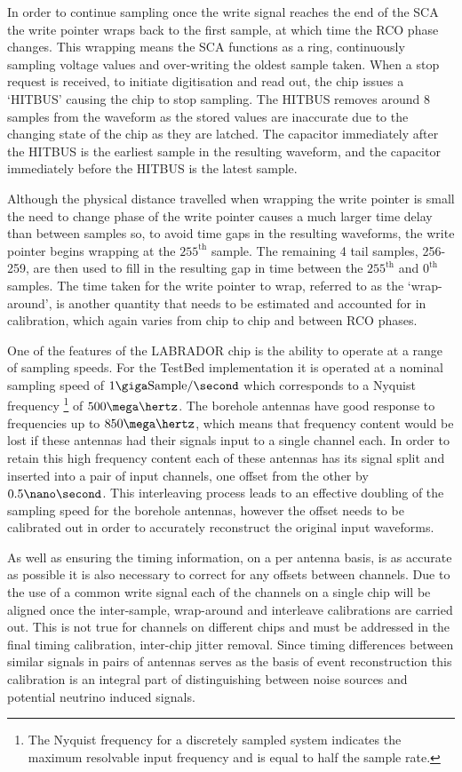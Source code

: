 In order to continue sampling once the write signal reaches the end of the SCA the write pointer wraps back to the first sample, at which time the RCO phase changes. This wrapping means the SCA functions as a ring, continuously sampling voltage values and over-writing the oldest sample taken. When a stop request is received, to initiate digitisation and read out, the chip issues a `HITBUS' causing the chip to stop sampling. The HITBUS removes around 8 samples from the waveform as the stored values are inaccurate due to the changing state of the chip as they are latched. The capacitor immediately after the HITBUS is the earliest sample in the resulting waveform, and the capacitor immediately before the HITBUS is the latest sample. 

Although the physical distance travelled when wrapping the write pointer is small the need to change phase of the write pointer causes a much larger time delay than between samples so, to avoid time gaps in the resulting waveforms, the write pointer begins wrapping at the $255^{\mbox{th}}$ sample. The remaining 4 tail samples, 256-259, are then used to fill in the resulting gap in time between the $255^{\mbox{th}}$ and $0^{\mbox{th}}$ samples.  The time taken for the write pointer to wrap, referred to as the `wrap-around', is another quantity that needs to be estimated and accounted for in calibration, which again varies from chip to chip and between RCO phases.


One of the features of the LABRADOR chip is the ability to operate at a range of sampling speeds. For the TestBed implementation it is operated at a nominal sampling speed of $1 \giga \mbox{Sample} /\second$ which corresponds to a Nyquist frequency \footnote{The Nyquist frequency for a discretely sampled system indicates the maximum resolvable input frequency and is equal to half the sample rate.} of $500 \mega \hertz$. The borehole antennas have good response to frequencies up to $850 \mega \hertz$, which means that frequency content would be lost if these antennas had their signals input to a single channel each. In order to retain this high frequency content each of these antennas has its signal split and inserted into a pair of input channels, one offset from the other by $0.5 \nano \second$. This interleaving process leads to an effective doubling of the sampling speed for the borehole antennas, however the offset needs to be calibrated out in order to accurately reconstruct the original input waveforms. 

As well as ensuring the timing information, on a per antenna basis, is as accurate as possible it is also necessary to correct for any offsets between channels. Due to the use of a common write signal each of the channels on a single chip will be aligned once the inter-sample, wrap-around and interleave calibrations are carried out. This is not true for channels on different chips and must be addressed in the final timing calibration, inter-chip jitter removal. Since timing differences between similar signals in pairs of antennas serves as the basis of event reconstruction this calibration is an integral part of distinguishing between noise sources and potential neutrino induced signals. 


